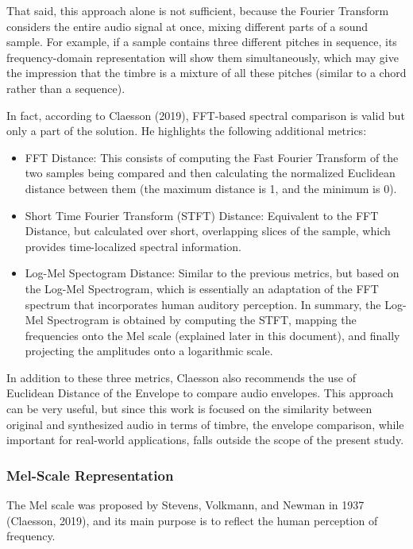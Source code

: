 \documentclass[sigconf,natbib=false]{acmart}
\begin{document}
That said, this approach alone is not sufficient, because the Fourier Transform considers the entire audio signal at once, mixing different parts of a sound sample. For example, if a sample contains three different pitches in sequence, its frequency-domain representation will show them simultaneously, which may give the impression that the timbre is a mixture of all these pitches (similar to a chord rather than a sequence).

In fact, according to Claesson (2019), FFT-based spectral comparison is valid but only a part of the solution. He highlights the following additional metrics:

\begin{itemize}
    \item FFT Distance: This consists of computing the Fast Fourier Transform of the two samples being compared and then calculating the normalized Euclidean distance between them (the maximum distance is 1, and the minimum is 0).
    \item Short Time Fourier Transform (STFT) Distance: Equivalent to the FFT Distance, but calculated over short, overlapping slices of the sample, which provides time-localized spectral information.
    \item Log-Mel Spectogram Distance: Similar to the previous metrics, but based on the Log-Mel Spectrogram, which is essentially an adaptation of the FFT spectrum that incorporates human auditory perception. In summary, the Log-Mel Spectrogram is obtained by computing the STFT, mapping the frequencies onto the Mel scale (explained later in this document), and finally projecting the amplitudes onto a logarithmic scale.
\end{itemize}

In addition to these three metrics, Claesson also recommends the use of Euclidean Distance of the Envelope to compare audio envelopes. This approach can be very useful, but since this work is focused on the similarity between original and synthesized audio in terms of timbre, the envelope comparison, while important for real-world applications, falls outside the scope of the present study.

\subsubsection{Mel-Scale Representation}

The Mel scale was proposed by Stevens, Volkmann, and Newman in 1937 (Claesson, 2019), and its main purpose is to reflect the human perception of frequency.
\end{document}
